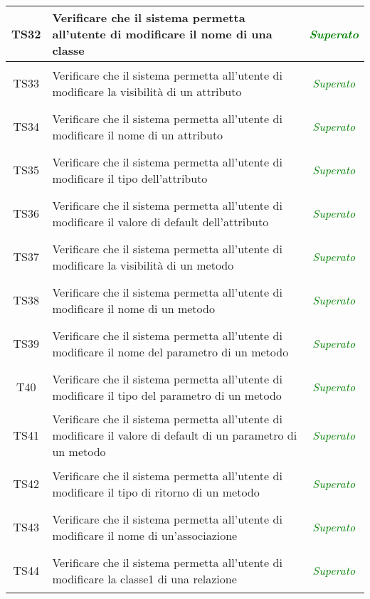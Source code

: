 \begin{longtable}{|c|>{}m{8cm}|c|}
\hypertarget{TS32}{TS32} & Verificare che il sistema permetta all'utente di modificare il nome di una classe & \textcolor{Green}{\textit{Superato}}\\ \hline
\hypertarget{TS33}{TS33} & Verificare che il sistema permetta all'utente di modificare la visibilità di un attributo & \textcolor{Green}{\textit{Superato}}\\ \hline
\hypertarget{TS34}{TS34} & Verificare che il sistema permetta all'utente di modificare il nome di un attributo & \textcolor{Green}{\textit{Superato}}\\ \hline
\hypertarget{TS35}{TS35} & Verificare che il sistema permetta all'utente di modificare il tipo dell'attributo & \textcolor{Green}{\textit{Superato}}\\ \hline
\hypertarget{TS36}{TS36} & Verificare che il sistema permetta all'utente di modificare il valore di default dell'attributo & \textcolor{Green}{\textit{Superato}}\\ \hline
\hypertarget{TS37}{TS37} & Verificare che il sistema permetta all'utente di modificare la visibilità di un metodo & \textcolor{Green}{\textit{Superato}}\\ \hline
\hypertarget{TS38}{TS38} & Verificare che il sistema permetta all'utente di modificare il nome di un metodo & \textcolor{Green}{\textit{Superato}}\\ \hline
\hypertarget{TS39}{TS39} & Verificare che il sistema permetta all'utente di modificare il nome del parametro di un metodo & \textcolor{Green}{\textit{Superato}}\\ \hline
\hypertarget{TS40}{T40} & Verificare che il sistema permetta all'utente di modificare il tipo del parametro di un metodo & \textcolor{Green}{\textit{Superato}}\\ \hline
\hypertarget{TS41}{TS41} & Verificare che il sistema permetta all'utente di modificare il valore di default di un parametro di un metodo & \textcolor{Green}{\textit{Superato}}\\ \hline
\hypertarget{TS42}{TS42} & Verificare che il sistema permetta all'utente di modificare il tipo di ritorno di un metodo & \textcolor{Green}{\textit{Superato}}\\ \hline
\hypertarget{TS43}{TS43} & Verificare che il sistema permetta all'utente di modificare il nome di un'associazione & \textcolor{Green}{\textit{Superato}}\\ \hline
\hypertarget{TS44}{TS44} & Verificare che il sistema permetta all'utente di modificare la classe1 di una relazione & \textcolor{Green}{\textit{Superato}}\\ \hline

\end{longtable}
